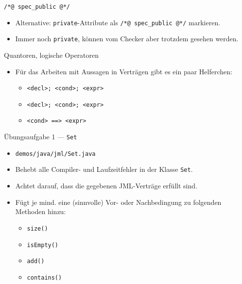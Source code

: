 \documentclass{beamer}
\begin{document}
\begin{frame}{\texttt{/*@ spec\_public @*/}}

	\begin{itemize}
		\item Alternative: \texttt{private}-Attribute als \texttt{/*@ spec\_public @*/} markieren.
		\item Immer noch \texttt{private}, können vom Checker aber trotzdem gesehen werden.
	\end{itemize}
\end{frame}

\begin{frame}{Quantoren, logische Operatoren}

	\begin{itemize}
		\item Für das Arbeiten mit Aussagen in Verträgen gibt es ein paar Helferchen:
		\begin{itemize}
			\item \texttt{\string\forall <decl>; <cond>; <expr>}
			\item \texttt{\string\exists <decl>; <cond>; <expr>}
			\item \texttt{<cond> ==> <expr>}
		\end{itemize}
	\end{itemize}
\end{frame}

\begin{frame}{Übungsaufgabe 1 --- \texttt{Set}}
	\begin{itemize}
		\item \texttt{demos/java/jml/Set.java}
		\item Behebt alle Compiler- und Laufzeitfehler in der Klasse \texttt{Set}.
		\pause
		\item Achtet darauf, dass die gegebenen JML-Verträge erfüllt sind.
		\pause
		\item Fügt je mind. eine (sinnvolle) Vor- oder Nachbedingung zu folgenden Methoden hinzu:
		\begin{itemize}
			\item \texttt{size()}
			\item \texttt{isEmpty()}
			\item \texttt{add()}
			\item \texttt{contains()}
		\end{itemize}
	\end{itemize}
\end{frame}
\end{document}
